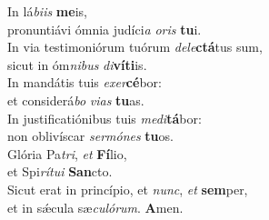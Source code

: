 \oddverse In lá\textit{bi}\textit{is} \textbf{me}is,~\*\\
\oddverse pronuntiávi ómnia judíci\textit{a} \textit{o}\textit{ris} \textbf{tu}i.\\
\evenverse In via testimoniórum tuórum \textit{de}\textit{le}\textbf{ctá}tus sum,~\*\\
\evenverse sicut in óm\textit{ni}\textit{bus} \textit{di}\textbf{ví}\textbf{ti}is.\\
\oddverse In mandátis tuis \textit{e}\textit{xer}\textbf{cé}bor:~\*\\
\oddverse et considerá\textit{bo} \textit{vi}\textit{as} \textbf{tu}as.\\
\evenverse In justificatiónibus tuis \textit{me}\textit{di}\textbf{tá}bor:~\*\\
\evenverse non oblivíscar \textit{ser}\textit{mó}\textit{nes} \textbf{tu}os.\\
\oddverse Glória Pa\textit{tri}, \textit{et} \textbf{Fí}lio,~\*\\
\oddverse et Spi\textit{rí}\textit{tu}\textit{i} \textbf{San}cto.\\
\evenverse Sicut erat in princípio, et \textit{nunc}, \textit{et} \textbf{sem}per,~\*\\
\evenverse et in sǽcula sæ\textit{cu}\textit{ló}\textit{rum}. \textbf{A}men.\\
